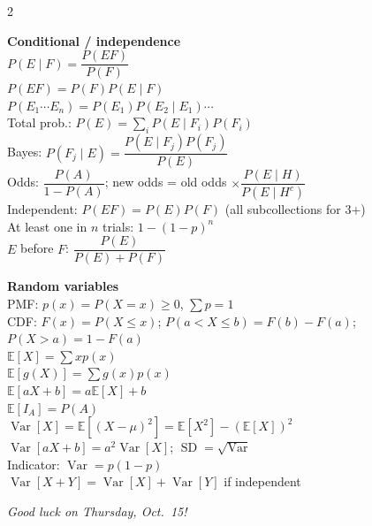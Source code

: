 \documentclass[11pt]{article}
\newcommand{\E}{\mathbb{E}}
\newcommand{\Var}{\operatorname{Var}}
\newcommand{\SD}{\operatorname{SD}}
\begin{document}
\begin{multicols}{2}
\columnbreak

\textbf{Conditional / independence}\\[2pt]
$P(E\mid F)=\dfrac{P(EF)}{P(F)}$\\
$P(EF)=P(F)P(E\mid F)$\\
$P(E_1\cdots E_n)=P(E_1)P(E_2\mid E_1)\cdots$\\
Total prob.: $P(E)=\sum_iP(E\mid F_i)P(F_i)$\\
Bayes: $P(F_j\mid E)=\dfrac{P(E\mid F_j)P(F_j)}{P(E)}$\\
Odds: $\dfrac{P(A)}{1-P(A)}$; new odds = old odds $\times\dfrac{P(E\mid H)}{P(E\mid H^c)}$\\
Independent: $P(EF)=P(E)P(F)$ (all subcollections for 3+)\\
At least one in $n$ trials: $1-(1-p)^n$\\
$E$ before $F$: $\dfrac{P(E)}{P(E)+P(F)}$

\medskip
\textbf{Random variables}\\[2pt]
PMF: $p(x)=P(X=x)\ge0$, $\sum p=1$\\
CDF: $F(x)=P(X\le x)$; $P(a<X\le b)=F(b)-F(a)$; $P(X>a)=1-F(a)$\\
$\E[X]=\sum xp(x)$\\
$\E[g(X)]=\sum g(x)p(x)$\\
$\E[aX+b]=a\E[X]+b$\\
$\E[I_A]=P(A)$\\
$\Var[X]=\E[(X-\mu)^2]=\E[X^2]-(\E[X])^2$\\
$\Var[aX+b]=a^2\Var[X]$; $\SD=\sqrt{\Var}$\\
Indicator: $\Var=p(1-p)$\\
$\Var[X+Y]=\Var[X]+\Var[Y]$ if independent
\end{multicols}

\vfill
\begin{center}\emph{Good luck on Thursday, Oct.\ 15!}\end{center}
\end{document}
